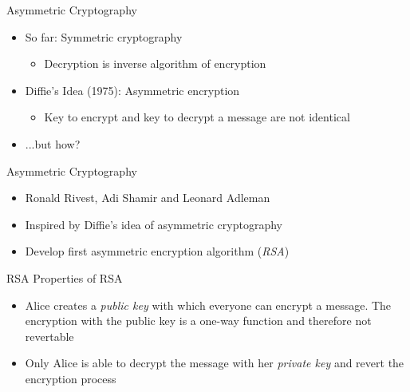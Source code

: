 \documentclass[]{beamer}
\begin{document}
\begin{frame}{Asymmetric Cryptography}
	\begin{itemize}
		\item<1-> So far: Symmetric cryptography
		\begin{itemize}
			\item<1->Decryption is inverse algorithm of encryption
		\end{itemize}
		\item<2-> Diffie's Idea (1975): Asymmetric encryption
		\begin{itemize}
			\item<2->Key to encrypt and key to decrypt a message are not identical
		\end{itemize}
		\item<3->...but how?
	\end{itemize}
\end{frame}

\begin{frame}{Asymmetric Cryptography}
	\begin{itemize}
		\item<1-> Ronald Rivest, Adi Shamir and Leonard Adleman
		\item<2-> Inspired by Diffie's idea of asymmetric cryptography
		\item<3-> Develop first asymmetric encryption algorithm (\textit{RSA}) \cite{rivest1978}
	\end{itemize}
\end{frame}

\begin{frame}{RSA}
	Properties of RSA
	\begin{itemize}
		\item<1->[(a)] Alice creates a \textit{public key} with which everyone can encrypt a message. The encryption with the public key is a one-way function and therefore not revertable
		\item<2->[(b)] Only Alice is able to decrypt the message with her \textit{private key} and revert the encryption process
	\end{itemize}
\end{frame}
\end{document}
